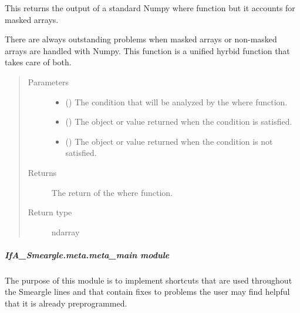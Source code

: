 \documentclass[letterpaper,10pt,english]{sphinxmanual}
\begin{document}
\begin{fulllineitems}
\label{\detokenize{python_docstrings/IfA_Smeargle.meta.mathematics:IfA_Smeargle.meta.mathematics.smeargle_where}}
This returns the output of a standard Numpy where function but it
accounts for masked arrays.

There are always outstanding problems when masked arrays or non-masked
arrays are handled with Numpy. This function is a unified hyrbid function
that takes care of both.
\begin{quote}\begin{description}
\item[{Parameters}] \leavevmode\begin{itemize}
\item {} 
 (\sphinxstyleliteralemphasis{\sphinxupquote{, }}) \textendash{} The condition that will be analyzed by the where function.

\item {} 
 () \textendash{} The object or value returned when the condition is satisfied.

\item {} 
 () \textendash{} The object or value returned when the condition is not satisfied.

\end{itemize}

\item[{Returns}] \leavevmode
{} \textendash{} The return of the where function.

\item[{Return type}] \leavevmode
ndarray

\end{description}\end{quote}

\end{fulllineitems}



\subparagraph{IfA\_Smeargle.meta.meta\_main module}
\label{\detokenize{python_docstrings/IfA_Smeargle.meta.meta_main:module-IfA_Smeargle.meta.meta_main}}\label{\detokenize{python_docstrings/IfA_Smeargle.meta.meta_main:ifa-smeargle-meta-meta-main-module}}\label{\detokenize{python_docstrings/IfA_Smeargle.meta.meta_main::doc}}
The purpose of this module is to implement shortcuts that are used throughout the Smeargle
lines and that contain fixes to problems the user may find helpful that it is already
preprogrammed.
\end{document}
